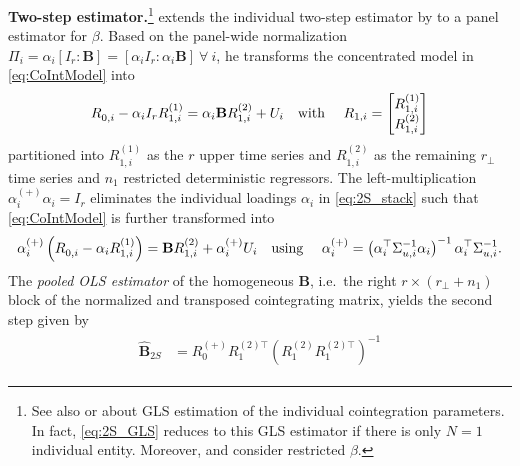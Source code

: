 \textbf{Two-step estimator.}\footnote{See also \citet[Ch.~7.2.2]{Lutkepohl2005} or \citet{BruggemannLutkepohl2005} about GLS estimation of the individual cointegration parameters. In fact, \eqref{eq:2S_GLS} reduces to this GLS estimator if there is only $ N=1 $ individual entity. Moreover, \citet[Ch.~7.3.2]{Lutkepohl2005} and \citet[p.~159]{Breitung2005} consider restricted $ \beta $.} 
\citet{Breitung2005} extends the individual two-step estimator by \citet{AhnReisel1990} to a panel estimator for $\beta$. Based on the panel-wide normalization $\Pi_i = \alpha_i \left[I_r : \mathbf{B} \right] = \left[ \alpha_i I_r : \alpha_i \mathbf{B} \right] \ \forall \ i $, he transforms the concentrated model in \eqref{eq:CoIntModel} into
\begin{align} \label{eq:2S_stack}
\begin{split}
	R^{\ }_{0,i} - \alpha_i I_r R_{1,i}^{(1)} & = \alpha_i \mathbf{B} R_{1,i}^{(2)} + U_{i} \text{\quad with \quad}
	R_{1,i} = \begin{bmatrix} R_{1,i}^{(1)} \\ R_{1,i}^{(2)} \end{bmatrix} \\
\end{split}
\end{align}
partitioned into $ R_{1,i}^{(1)} $ as the $ r $ upper time series and $ R_{1,i}^{(2)} $ as the remaining $ r_\perp $ time series and $ n_1 $ restricted deterministic regressors. The left-multiplication $ \alpha_{i}^{(+)} \alpha_i = I_r $ eliminates the individual loadings $ \alpha_{i} $ in \eqref{eq:2S_stack} such that \eqref{eq:CoIntModel} is further transformed into
\begin{align} \label{eq:2S_aux}
\begin{split}
	\alpha_{i}^{(+)} \left(R^{\ }_{0,i} - \alpha_{i} R_{1,i}^{(1)} \right) & = \mathbf{B} R_{1,i}^{(2)} + \alpha_{i}^{(+)} U_{i} \text{\quad using \quad} \alpha_{i}^{(+)} = \left( \alpha_i^\top \Sigma_{u,i}^{-1} \alpha_i \right)^{-1} \alpha_i^\top \Sigma_{u,i}^{-1}. \\
\end{split}
\end{align}
The \textit{pooled OLS estimator} of the homogeneous $ \mathbf{B} $, i.e.~the right $ r \times \left( r_\perp + n_1 \right) $ block of the normalized and transposed cointegrating matrix, yields the second step given by
\begin{align} \label{eq:2S_GLS}
\begin{split}
	\widehat{\mathbf{B}}_{2S} & = R_0^{(+)} R_1^{(2) \top} \left( R_1^{(2)} R_1^{(2) \top} \right)^{-1}
\end{split}
\end{align}

